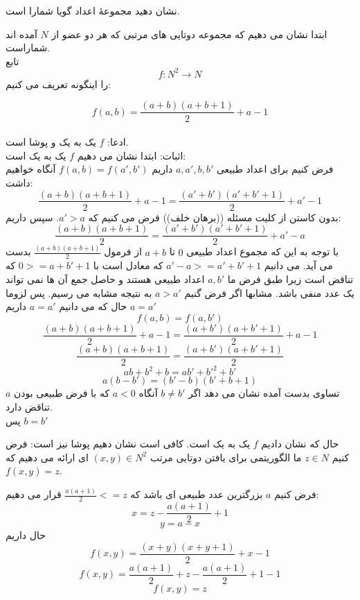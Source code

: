 نشان دهید مجموعهٔ اعداد گویا شمارا است.
\begin{ans}
    ابتدا نشان می دهیم که مجموعه دوتایی های مرتبی که هر دو عضو از 
    $N$
    آمده اند شماراست.
    \\
    تابع
    \[f:N^{2}\rightarrow N\]
    را اینگونه تعریف می کنیم:

    \[f(a,b) = \frac{(a+b)(a+b+1)}{2} + a - 1\]
    \\
    ادعا: 
    $f$
    یک به یک و پوشا است. 
    \\
    اثبات:
    ابتدا نشان می دهیم 
    $f$
    یک به یک است:
    \\
    فرض کنیم برای اعداد طبیعی
    $a,a',b,b'$
    داریم
    $f(a,b) = f(a',b')$
    آنگاه خواهیم داشت:
    \[\frac{(a+b)(a+b+1)}{2} + a - 1 = \frac{(a'+b')(a'+b'+1)}{2} + a' - 1\]
    بدون کاستن از کلیت  مسئله ((برهان خلف)) فرض می کنیم که 
    $a' > a$.
    سپس داریم:
    \[\frac{(a+b)(a+b+1)}{2} = \frac{(a'+b')(a'+b'+1)}{2} + a' - a\]
    با توجه به این که مجموع اعداد طبیعی 
    $0$
    تا
    $a+b$
    از فرمول 
    $\frac{(a+b)(a+b+1)}{2}$
    بدست می آید. می دانیم 
    $a'-a >= a'+b'+1$
    که معادل است با
    $0 >= a + b' + 1$
    که تناقض است زیرا طبق فرض ما 
    $a,b'$
    اعداد طبیعی هستند و حاصل جمع آن ها نمی تواند یک عدد منفی باشد. مشابها اگر فرض گنیم
    $a > a'$
    به نتیجه مشابه می رسیم. پس لزوما
    $a = a'$
    حال که می دانیم
    $a = a'$
    داریم
    \[f(a,b) = f(a,b')\]
    \[\frac{(a+b)(a+b+1)}{2} + a - 1 = \frac{(a+b')(a+b'+1)}{2} + a - 1\]
    \[\frac{(a+b)(a+b+1)}{2} = \frac{(a+b')(a+b'+1)}{2}\]
    \[ab + b^{2} + b = ab' + b'^{2} + b'\]
    \[a(b-b') = (b'-b)(b'+b+1)\]
    تساوی بدست آمده نشان می دهد اگر 
    $b \neq b'$
    آنگاه 
    $a < 0$
    که با فرض طبیعی بودن 
    $a$
    تناقض دارد.
    \\
    پس 
    $b = b'$

    حال که نشان دادیم 
    $f$
    یک به یک است. کافی است نشان دهیم پوشا نیز است:
    فرض کنیم 
    $z \in N$
    ما الگوریتمی برای یافتن دوتایی مرتب 
    $(x,y) \in N^{2}$
    ای ارائه می دهیم که 
    $f(x,y) = z$.

    فرض کنیم 
    $a$
    بزرگترین عدد طبیعی ای باشد که 
    $\frac{a(a+1)}{2} <= z$
    قرار می دهیم:
    \[x = z - \frac{a(a+1)}{2} + 1\]
    \[y = a - x\]
    حال داریم
    \[f(x,y) = \frac{(x+y)(x+y+1)}{2} + x - 1\]
    \[f(x,y) = \frac{a(a+1)}{2} + z - \frac{a(a+1)}{2} + 1 -1\]
    \[f(x,y) = z\]


\end{ans}

